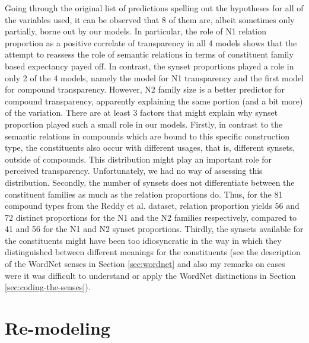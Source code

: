 Going through the original list of predictions spelling out the
hypotheses for all of the variables used, it can be observed that 8 of them are,
albeit sometimes only partially, borne out by our models. In
particular, the role of N1 relation proportion as a positive correlate
of transparency in all 4 models shows that the attempt to reassess
the role of semantic relations in terms of constituent family based
expectancy payed off. In contrast, the synset proportions played a
role in only 2 of the 4 models, namely the model for N1 transparency and the first
model for compound transparency. However, N2 family
size is a better predictor for compound transparency,
apparently explaining the same portion (and a bit more) of the
variation. There are at least 3 factors that might explain why synset
proportion played such a small role in
our models. Firstly, in contrast to the semantic relations in
compounds which are bound to this specific construction type, the
constituents also occur with different usages, that is, different
synsets, outside of compounds. This distribution might play an
important role for perceived transparency. Unfortunately, we had no way of
assessing this distribution. Secondly, the number of synsets
does not differentiate between the constituent families as
much as the relation proportions do. Thus, for the 81 compound types
from the Reddy et al. dataset, relation proportion yields 56 and 72
distinct proportions for the N1 and the N2 families respectively,
compared to 41 and 56 for the N1 and N2 synset proportions. Thirdly,
the synsets available for the constituents might have been too
idiosyncratic in the way in which they distinguished between different meanings
for the constituents (see the description of the WordNet
senses in Section \ref{sec:wordnet} and also my remarks on cases were
it was difficult to understand or apply the WordNet distinctions in
Section \ref{sec:coding-the-senses}).  


\section{Re-modeling \citet{BellandSchaefer:2016}}
\label{sec:bellandschaefer2016_new_models}

